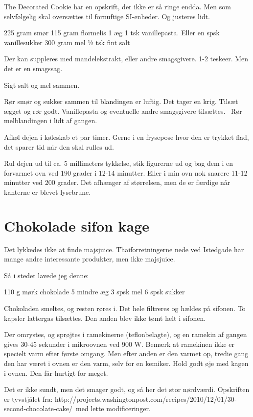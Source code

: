 \documentclass[
  letterpaper,
  DIV=11,
  numbers=noendperiod]{scrreprt}
\begin{document}
The Decorated Cookie har en opskrift, der ikke er så ringe endda. Men
som selvfølgelig skal oversættes til fornuftige SI-enheder. Og justeres
lidt.

225 gram smør 115 gram flormelis 1 æg 1 tsk vanillepasta. Eller en spsk
vanillesukker 300 gram mel ½ tsk fint salt

Der kan suppleres med mandelekstrakt, eller andre smagsgivere. 1-2
teskeer. Men det er en smagssag.

Sigt salt og mel sammen.

Rør smør og sukker sammen til blandingen er luftig. Det tager en krig.
Tilsæt ægget og rør godt. Vanillepasta og eventuelle andre smagsgivere
tilsættes.~ Rør melblandingen i lidt af gangen.

Afkøl dejen i køleskab et par timer. Gerne i en frysepose hvor den er
trykket flad, det sparer tid når den skal rulles ud.

Rul dejen ud til ca. 5 millimeters tykkelse, stik figurerne ud og bag
dem i en forvarmet ovn ved 190 grader i 12-14 minutter. Eller i min ovn
nok snarere 11-12 minutter ved 200 grader. Det afhænger af størrelsen,
men de er færdige når kanterne er blevet lysebrune.

\hypertarget{chokolade-sifon-kage-1}{%
\section{Chokolade sifon kage}\label{chokolade-sifon-kage-1}}

Det lykkedes ikke at finde majsjuice. Thaiforretningerne nede ved
Istedgade har mange andre interessante produkter, men ikke majsjuice.

Så i stedet lavede jeg denne:

110 g mørk chokolade 5 mindre æg 3 spsk mel 6 spsk sukker

Chokoladen smeltes, og resten røres i. Det hele filtreres og hældes på
sifonen. To kapsler lattergas tilsættes. Den anden blev ikke tømt helt i
sifonen.

Der omrystes, og sprøjtes i ramekinerne (teflonbelagte), og en ramekin
af gangen gives 30-45 sekunder i mikroovnen ved 900 W. Bemærk at
ramekinen ikke er specielt varm efter første omgang. Men efter anden er
den varmet op, tredie gang den har været i ovnen er den varm, selv for
en kemiker. Hold godt øje med kagen i ovnen. Den får hurtigt for meget.

Det er ikke sundt, men det smager godt, og så her det stor nørdværdi.
Opskriften er tyvstjålet fra:
http://projects.washingtonpost.com/recipes/2010/12/01/30-second-chocolate-cake/~med
lette modificeringer.
\end{document}
